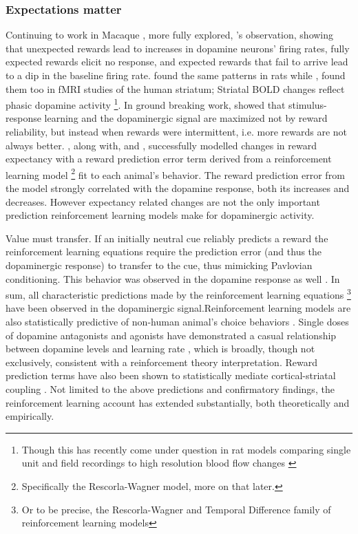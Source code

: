 \documentclass[doc,12pt]{apa}        %
\begin{document}
\subsubsection{Expectations matter} %
\label{subsub:expectations}
Continuing to work in Macaque , more fully explored, 's observation, showing that unexpected rewards lead to increases in dopamine neurons' firing rates, fully expected rewards elicit no response, and expected rewards that fail to arrive lead to a dip in the baseline firing rate.    found the same patterns in rats while , found them too in fMRI studies of the human striatum; Striatal BOLD changes reflect phasic dopamine activity \cite{Schonberg:2009p6669,Surmeier:2007p4435}
\footnote{
    Though this has recently come under question in rat models comparing single unit and field recordings to high resolution blood flow changes \cite{Mishra:2011p9095}}. In ground breaking work,  showed that stimulus-response learning and the dopaminergic signal are maximized not by reward reliability, but instead when rewards were intermittent, i.e. more rewards are not always better.  , along with,  and , successfully modelled changes in reward expectancy with a reward prediction error term derived from a reinforcement learning model
\footnote{
    Specifically the Rescorla-Wagner model, more on that later.
} fit to each animal's behavior. The reward prediction error from the model strongly correlated with the dopamine response, both its increases and decreases. However expectancy related changes are not the only important prediction reinforcement learning models make for dopaminergic activity.  

Value must transfer.  If an initially neutral cue reliably predicts a reward the reinforcement learning equations require the prediction error (and thus the dopaminergic response) to transfer to the cue, thus mimicking Pavlovian conditioning.  This behavior was observed in the dopamine response as well \cite{Roesch:2007p2519, McClure:2003p3346}.  In sum, all characteristic predictions made by the reinforcement learning equations
\footnote{Or to be precise, the Rescorla-Wagner and Temporal Difference family of reinforcement learning models} have been observed in the dopaminergic signal.Reinforcement learning models are also statistically predictive of non-human animal's choice behaviors \cite{Hampton:2007p2983}.  Single doses of dopamine antagonists and agonists have demonstrated a casual relationship between dopamine levels and learning rate \cite{Pizzagalli:2008p6521, Diaconescu:2010p7631}, which is broadly, though not exclusively, consistent with a reinforcement theory interpretation.  Reward prediction terms have also been shown to statistically mediate cortical-striatal coupling \cite{denOuden:2010p7203}.  Not limited to the above predictions and confirmatory findings, the reinforcement learning account has extended substantially, both theoretically and empirically.
\end{document}
